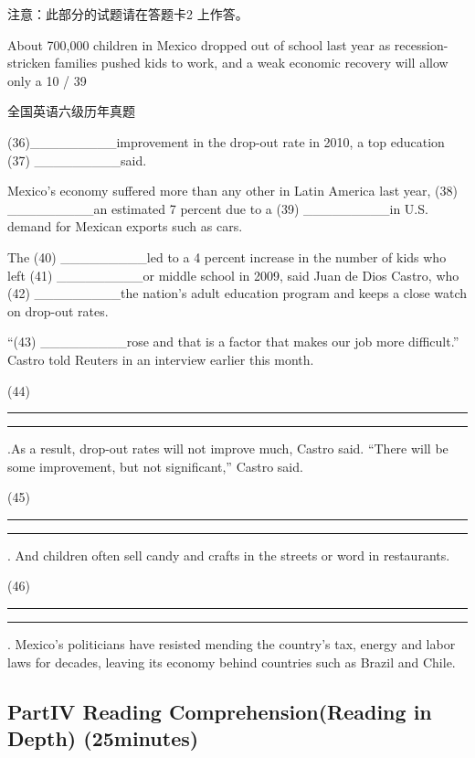 \documentclass[UTF8,11pt]{ctexart}
\begin{document}
注意：此部分的试题请在答题卡2 上作答。


About 700,000 children in Mexico dropped out of school last year as recession-stricken families pushed kids to work, and a weak economic recovery will allow only a 10 / 39


全国英语六级历年真题


(36)\_\_\_\_\_\_\_\_\_improvement in the drop-out rate in 2010, a top education (37) \_\_\_\_\_\_\_\_\_said.


Mexico’s economy suffered more than any other in Latin America last year, (38) \_\_\_\_\_\_\_\_\_an estimated 7 percent due to a (39) \_\_\_\_\_\_\_\_\_in U.S. demand for Mexican exports such as cars.


The (40) \_\_\_\_\_\_\_\_\_led to a 4 percent increase in the number of kids who left (41) \_\_\_\_\_\_\_\_\_or middle school in 2009, said Juan de Dios Castro, who (42) \_\_\_\_\_\_\_\_\_the nation’s adult education program and keeps a close watch on drop-out rates.


“(43) \_\_\_\_\_\_\_\_\_rose and that is a factor that makes our job more difficult.” Castro told Reuters in an interview earlier this month.


(44)\par\noindent\rule{.95\linewidth}{.4pt}\par  \par\noindent\rule{.95\linewidth}{.4pt}\par .As a result, drop-out rates will not improve much, Castro said. “There will be some improvement, but not significant,” Castro said.


(45)\par\noindent\rule{.95\linewidth}{.4pt}\par  \par\noindent\rule{.95\linewidth}{.4pt}\par . And children often sell candy and crafts in the streets or word in restaurants.


(46)\par\noindent\rule{.95\linewidth}{.4pt}\par  \par\noindent\rule{.95\linewidth}{.4pt}\par . Mexico’s politicians have resisted mending the country’s tax, energy and labor laws for decades, leaving its economy behind countries such as Brazil and Chile.


\subsection*{\textbf{Part}IV \textbf{Reading} \textbf{Comprehension(Reading in Depth)} \textbf{(25minutes)}}
\end{document}
